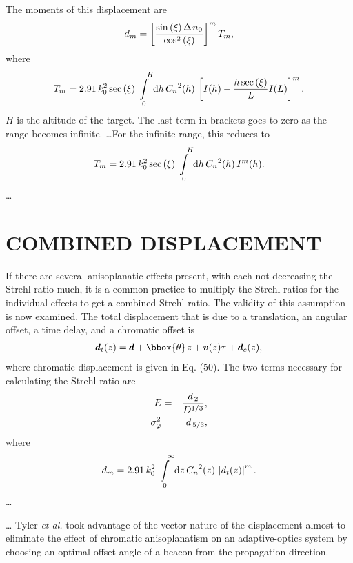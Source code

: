 The moments of this displacement are \begin{eqnarray} d_m=\left[
{{{\sin \left( \xi  \right)\Delta \kern 1ptn_0} \over {\cos
^2\left( \xi  \right)}}} \right]^mT_m  ,        \end{eqnarray}
where
\begin{eqnarray} T_m=2.91\,k_0^2\sec \left( \xi
\right)\int\limits_{\,\,\, 0}^{\,\,\,\,\,\, H}  {\rm
d}h\,{C_n}^2(h)\,\left[ {I(h)-{{h\sec \left( \xi  \right)} \over
L}I(L)}  \right]^m  .
\end{eqnarray} $H$ is the altitude of the
target.  The last term in brackets goes to zero  as the range
becomes infinite.  \ldots For the infinite range, this reduces to
     \begin{eqnarray} T_m=2.91\,k_0^2\sec \left( \xi
\right)\int\limits_{\,\,\, 0}^{\,\,\,\,\,\, H} {\rm
d}h\,{C_n}^2(h)\,I^m(h)  .
\end{eqnarray}
\ldots

\section{ COMBINED DISPLACEMENT}
\label{cd}
If there are several anisoplanatic  effects present, with each not
decreasing the Strehl ratio much, it is a  common practice to
multiply the Strehl ratios for the individual effects  to get a
combined Strehl ratio.  The validity of this assumption is now
examined.  The total displacement that is due to a translation, an
angular offset, a time delay, and a chromatic offset is
\begin{eqnarray}
{\rm \pmb{d}}_t(z)={\rm  \pmb{d}}+{ \rm \bbox{
\theta}} \kern 1ptz+{\rm \pmb{v}}(z)\tau +{\rm  \pmb{d}}_c(z)  ,
\end{eqnarray} where chromatic displacement is given in Eq. (50).
The two terms  necessary for calculating the Strehl ratio are
\begin{eqnarray} E&=&{{d_{\,2}}  \over {D^{1/ 3}}}  ,          \\
\sigma _\varphi ^2&=&d_{\,5/  3}  ,   \end{eqnarray} where
\begin{eqnarray} d_m=2.91\,k_0^2\int\limits_{\,\,\, 0}^{\,\,\,\,\,\,
\infty}   {\rm d}z\,{C_n}^2(z)\,\left| {d_t(z)} \right|^m  .
\end{eqnarray}
\ldots

\ldots
Tyler {\it et al.}\cite{18} took advantage of the vector nature  of
the displacement almost to eliminate the effect of chromatic
anisoplanatism on an adaptive-optics system by choosing an optimal
offset angle of a beacon from the propagation direction.

